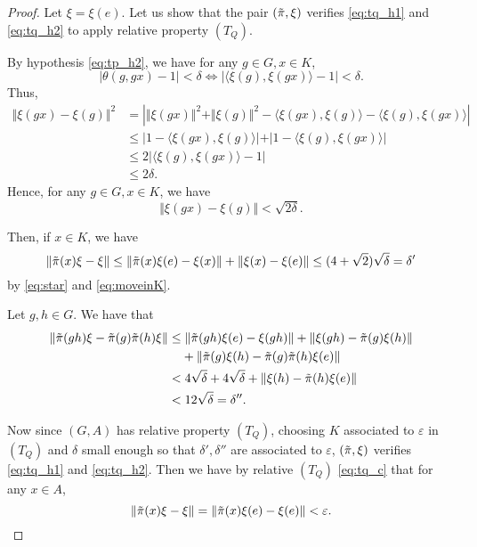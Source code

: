 \documentclass{article}
\theoremstyle{definition}
\theoremstyle{remark}
\numberwithin{equation}{section}
\begin{document}
\begin{proof}
Let $\xi=\xi(e)$. Let us show that the pair $(\Tilde{\pi},\xi)$ verifies \eqref{eq:tq_h1} and \eqref{eq:tq_h2} to apply relative property $(T_Q)$.

By hypothesis \eqref{eq:tp_h2}, we have for any $g\in G,x\in K$, $$\vert \theta(g,gx)-1\vert < \delta
  \Longleftrightarrow    \vert \langle \xi(g),\xi(gx)\rangle -1\vert < \delta.$$
Thus, \begin{align*}
    \Vert \xi(gx)-\xi(g)\Vert^2 & =  \left\vert\Vert \xi(gx)\Vert^2+\Vert \xi(g)\Vert^2 - \langle \xi(gx),\xi(g)\rangle - \langle \xi(g),\xi(gx)\rangle \right\vert\\
     & \leq  \vert 1-\langle \xi(gx),\xi(g)\rangle \vert + \vert 1-\langle \xi(g),\xi(gx)\rangle\vert\\
     & \leq  2\vert \langle \xi(g),\xi(gx)\rangle -1\vert\\
     & \leq  2\delta.
\end{align*}Hence, for any $g\in G,x\in K$, we have \begin{equation} \label{eq:moveinK} \Vert \xi(gx)-\xi(g)\Vert < \sqrt{2\delta}.
\end{equation}

Then, if $x\in K$, we have $$\Vert\Tilde{\pi}(x)\xi-\xi\Vert\leq \Vert \Tilde{\pi}(x)\xi(e)-\xi(x)\Vert+\Vert \xi(x)-\xi(e)\Vert \leq (4+\sqrt{2})\sqrt{\delta}=\delta'$$ by \eqref{eq:star} and \eqref{eq:moveinK}.\medskip

Let $g,h\in G$. We have that \begin{align*}
    \Vert \Tilde{\pi}(gh)\xi-\Tilde{\pi}(g)\Tilde{\pi}(h)\xi\Vert & \leq  \Vert \Tilde{\pi}(gh)\xi(e)-\xi(gh)\Vert+\Vert \xi(gh)-\Tilde{\pi}(g)\xi(h)\Vert\\
    &\phantom{{}\leq}+\Vert \Tilde{\pi}(g)\xi(h)-\Tilde{\pi}(g)\Tilde{\pi}(h)\xi(e)\Vert\\ 
     & <  4\sqrt{\delta}+4\sqrt{\delta}+\Vert \xi(h)-\Tilde{\pi}(h)\xi(e)\Vert\\
     & <  12\sqrt{\delta}=\delta''.
\end{align*}

Now since $(G,A)$ has relative property $(T_Q)$, choosing $K$ associated to $\varepsilon$ in $(T_Q)$ and $\delta$ small enough so that $\delta',\delta''$ are associated to $\varepsilon$, $(\Tilde{\pi},\xi)$ verifies \eqref{eq:tq_h1} and \eqref{eq:tq_h2}. Then we have by relative $(T_Q)$ \eqref{eq:tq_c} that for any $x\in A$, $$\Vert \Tilde{\pi}(x)\xi-\xi\Vert=\Vert \Tilde{\pi}(x)\xi(e)-\xi(e)\Vert<\varepsilon.$$ 


\end{proof}
\end{document}

